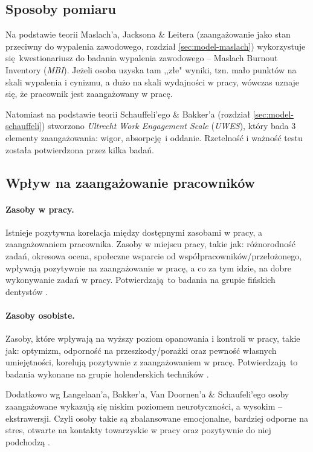 \subsection{Sposoby pomiaru}
Na podstawie teorii Maslach'a, Jacksona \& Leitera (zaangażowanie jako stan przeciwny do wypalenia zawodowego, rozdział \ref{sec:model-maslach}) wykorzystuje się kwestionariusz do badania wypalenia zawodowego -- Maslach Burnout Inventory (\emph{MBI}). Jeżeli osoba uzyska tam ,,złe" wyniki, tzn. mało punktów na skali wypalenia i cynizmu, a dużo na skali wydajności w pracy, wówczas uznaje się, że pracownik jest zaangażowany w pracę.

Natomiast na podstawie teorii Schauffeli'ego \& Bakker'a (rozdział \ref{sec:model-schauffeli}) stworzono \emph{Ultrecht Work Engagement Scale} (\emph{UWES}), który bada 3 elementy zaangażowania: wigor, absorpcję i oddanie. Rzetelność i ważność testu została potwierdzona przez kilka badań.

\subsection{Wpływ na zaangażowanie pracowników}
\paragraph{Zasoby w pracy.}
Istnieje pozytywna korelacja między dostępnymi zasobami w pracy, a zaangażowaniem pracownika. Zasoby w miejscu pracy, takie jak: różnorodność zadań, okresowa ocena, społeczne wsparcie od współpracowników/przełożonego, wpływają pozytywnie na zaangażowanie w pracę, a co za tym idzie, na dobre wykonywanie zadań w pracy. Potwierdzają to badania na grupie fińskich dentystów \citep{hakanen2008positive}.
\paragraph{Zasoby osobiste.}
Zasoby, które wpływają na wyższy poziom opanowania i kontroli w pracy, takie jak: optymizm, odporność na przeszkody/porażki oraz pewność własnych umiejętności, korelują pozytywnie z zaangażowaniem w pracę. Potwierdzają to badania wykonane na grupie holenderskich techników \citep{xanthopoulou2007role}.

Dodatkowo wg Langelaan'a, Bakker'a, Van Doornen'a \& Schaufeli'ego osoby zaangażowane wykazują się niskim poziomem neurotyczności, a wysokim -- ekstrawersji. Czyli osoby takie są zbalansowane emocjonalne, bardziej odporne na stres, otwarte na kontakty towarzyskie w pracy oraz pozytywnie do niej podchodzą \citep{langelaan2006burnout}. 

